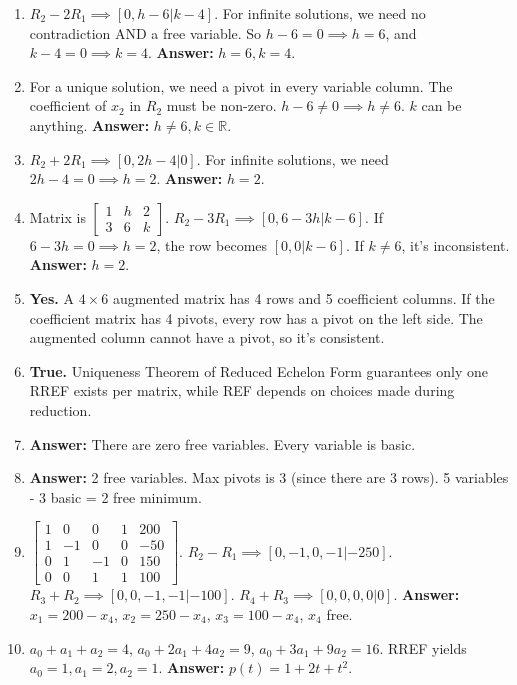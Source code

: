 \documentclass[11pt]{article}
\begin{document}
\begin{enumerate}[label=\textbf{Sol 1.2.\arabic*}]
    \item $R_2 - 2R_1 \implies [0, h-6 | k-4]$. For infinite solutions, we need no contradiction AND a free variable. So $h-6 = 0 \implies h=6$, and $k-4 = 0 \implies k=4$. \textbf{Answer:} $h = 6, k = 4$.
    \item For a unique solution, we need a pivot in every variable column. The coefficient of $x_2$ in $R_2$ must be non-zero. $h-6 \neq 0 \implies h \neq 6$. $k$ can be anything. \textbf{Answer:} $h \neq 6, k \in \mathbb{R}$.
    \item $R_2+2R_1 \implies [0, 2h-4 | 0]$. For infinite solutions, we need $2h-4 = 0 \implies h=2$. \textbf{Answer:} $h=2$.
    \item Matrix is $\left[\begin{array}{cc|c} 1 & h & 2 \\ 3 & 6 & k \end{array}\right]$. $R_2-3R_1 \implies [0, 6-3h | k-6]$. If $6-3h=0 \implies h=2$, the row becomes $[0, 0 | k-6]$. If $k \neq 6$, it's inconsistent. \textbf{Answer:} $h = 2$.
    \item \textbf{Yes.} A $4 \times 6$ augmented matrix has 4 rows and 5 coefficient columns. If the coefficient matrix has 4 pivots, every row has a pivot on the left side. The augmented column cannot have a pivot, so it's consistent.
    \item \textbf{True.} Uniqueness Theorem of Reduced Echelon Form guarantees only one RREF exists per matrix, while REF depends on choices made during reduction.
    \item \textbf{Answer:} There are zero free variables. Every variable is basic.
    \item \textbf{Answer:} 2 free variables. Max pivots is 3 (since there are 3 rows). 5 variables - 3 basic = 2 free minimum.
    \item $\left[\begin{array}{cccc|c} 1 & 0 & 0 & 1 & 200 \\ 1 & -1 & 0 & 0 & -50 \\ 0 & 1 & -1 & 0 & 150 \\ 0 & 0 & 1 & 1 & 100 \end{array}\right]$. $R_2-R_1 \implies [0, -1, 0, -1 | -250]$. $R_3+R_2 \implies [0, 0, -1, -1 | -100]$. $R_4+R_3 \implies [0, 0, 0, 0 | 0]$. \textbf{Answer:} $x_1 = 200-x_4$, $x_2 = 250-x_4$, $x_3 = 100-x_4$, $x_4$ free.
    \item $a_0+a_1+a_2=4$, $a_0+2a_1+4a_2=9$, $a_0+3a_1+9a_2=16$. RREF yields $a_0=1, a_1=2, a_2=1$. \textbf{Answer:} $p(t) = 1 + 2t + t^2$.

\end{enumerate}
\end{document}

